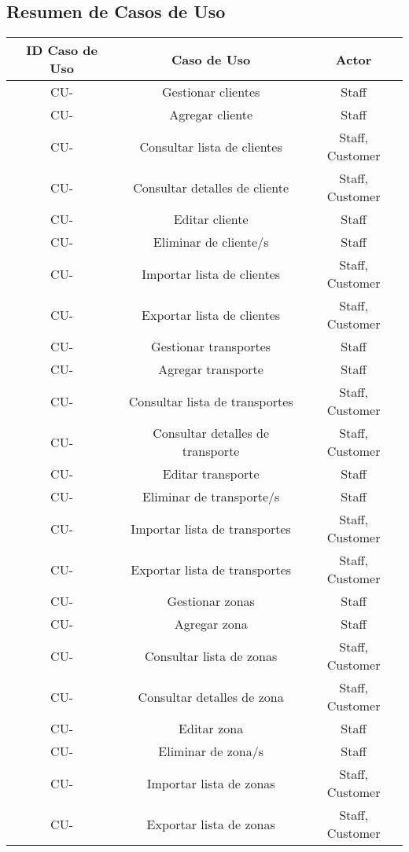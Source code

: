 \documentclass{article}
\begin{document}
    \subsection{Resumen de Casos de Uso}
    \begin{center}
        \begin{tabular}{ |c|c|c| } 
            \hline
            \rowcolor{lightgray}
            ID Caso de Uso & Caso de Uso & Actor \\
            \hline
            CU- & Gestionar clientes & Staff \\
            CU- & Agregar cliente & Staff \\
            CU- & Consultar lista de clientes & Staff, Customer \\
            CU- & Consultar detalles de cliente & Staff, Customer \\
            CU- & Editar cliente & Staff \\
            CU- & Eliminar de cliente/s & Staff \\
            CU- & Importar lista de clientes & Staff, Customer \\
            CU- & Exportar lista de clientes & Staff, Customer \\

            CU- & Gestionar transportes & Staff \\
            CU- & Agregar transporte & Staff \\
            CU- & Consultar lista de transportes & Staff, Customer \\
            CU- & Consultar detalles de transporte & Staff, Customer \\
            CU- & Editar transporte & Staff \\
            CU- & Eliminar de transporte/s & Staff \\
            CU- & Importar lista de transportes & Staff, Customer \\
            CU- & Exportar lista de transportes & Staff, Customer \\

            CU- & Gestionar zonas & Staff \\
            CU- & Agregar zona & Staff \\
            CU- & Consultar lista de zonas & Staff, Customer \\
            CU- & Consultar detalles de zona & Staff, Customer \\
            CU- & Editar zona & Staff \\
            CU- & Eliminar de zona/s & Staff \\
            CU- & Importar lista de zonas & Staff, Customer \\
            CU- & Exportar lista de zonas & Staff, Customer \\


\end{tabular}
\end{center}
\end{document}
